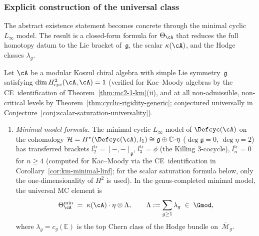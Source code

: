 \subsubsection*{Explicit construction of the universal class}

The abstract existence statement becomes concrete through
the minimal cyclic $L_\infty$ model.  The result is a closed-form
formula for $\Theta_{\cA}$ that reduces the full homotopy datum to
the Lie bracket of~$\mathfrak{g}$, the scalar $\kappa(\cA)$, and
the Hodge classes $\lambda_g$.

\begin{theorem}\label{thm:explicit-theta}
Let $\cA$ be a modular Koszul chiral algebra with simple Lie
symmetry~$\mathfrak{g}$ satisfying
$\dim H^2_{\mathrm{cyc}}(\cA,\cA) = 1$
\textup{(}verified for Kac--Moody algebras by the
CE~identification of
Theorem~\textup{\ref{thm:mc2-1-km}}\textup{(ii)},
and at all non-admissible, non-critical levels by
Theorem~\textup{\ref{thm:cyclic-rigidity-generic}};
conjectured universally in
Conjecture~\textup{\ref{conj:scalar-saturation-universality}}\textup{)}.
\begin{enumerate}[label=\textup{(\alph*)}]

\item \emph{Minimal-model formula.}
  The minimal cyclic $L_\infty$ model of $\Defcyc(\cA)$ on the
  cohomology
  $\mathcal{H} = H^*(\Defcyc(\cA), l_1) \cong \mathfrak{g} \oplus
  \mathbb{C}\!\cdot\!\eta$
  \textup{(}$\deg \mathfrak{g} = 0$, $\deg\eta = 2$\textup{)} has
  transferred brackets $l_2^{\mathrm{tr}} = [-,-]_{\mathfrak{g}}$,
  $l_3^{\mathrm{tr}} = \phi$
  \textup{(}the Killing $3$-cocycle\textup{)},
  $l_n^{\mathrm{tr}} = 0$ for $n \geq 4$
  \textup{(}computed for Kac--Moody via the CE~identification
  in Corollary~\textup{\ref{cor:km-minimal-linf}};
  for the scalar saturation formula below, only the
  one-dimensionality of\/ $H^2$ is used\textup{)}.
  In the genus-completed minimal model, the universal MC element
  is
  \begin{equation}\label{eq:theta-minimal}
  \Theta_{\cA}^{\min}
  \;=\;
  \kappa(\cA) \cdot \eta \otimes \Lambda,
  \qquad
  \Lambda := \sum_{g \geq 1} \lambda_g \;\in\; \Gmod,
  \end{equation}
  where $\lambda_g = c_g(\mathbb{E})$ is the top Chern class of the
  Hodge bundle on~$\overline{\mathcal{M}}_g$.


\end{enumerate}
\end{theorem}
